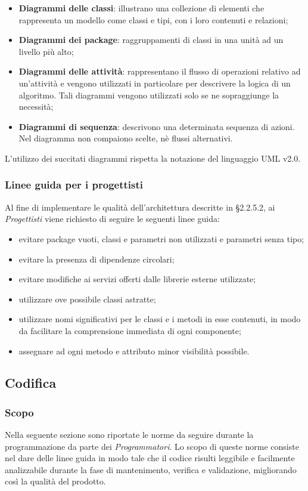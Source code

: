 \documentclass[../NomeDocumento.tex]{subfiles}
\begin{document}
	\begin{itemize}
		\item \textbf{Diagrammi delle classi}: illustrano una collezione di elementi che rappresenta un modello come classi e tipi, con i loro contenuti e relazioni;
		\item \textbf{Diagrammi dei package}: raggruppamenti di classi in una unità ad un livello più alto;
		\item \textbf{Diagrammi delle attività}: rappresentano il flusso di operazioni relativo ad
		un’attività e vengono utilizzati in particolare per descrivere la logica di un algoritmo. Tali diagrammi vengono utilizzati solo se ne sopraggiunge la necessità;
		\item \textbf{Diagrammi di sequenza}: descrivono una determinata sequenza di azioni. Nel diagramma non compaiono scelte, nè flussi
		alternativi.
	\end{itemize}

	\noindent L’utilizzo dei succitati diagrammi rispetta la notazione del linguaggio UML v2.0.
	
	\subsubsection{Linee guida per i progettisti}
	Al fine di implementare le qualità dell’architettura descritte in §2.2.5.2, ai \textit{Progettisti} viene
	richiesto di seguire le seguenti linee guida:
	\begin{itemize}
		\item evitare package vuoti, classi e parametri non utilizzati e parametri senza tipo;
		\item evitare la presenza di dipendenze circolari;
		\item evitare modifiche ai servizi offerti dalle librerie esterne utilizzate;
		\item utilizzare ove possibile classi astratte;
		\item utilizzare nomi significativi per le classi e i metodi in esse contenuti, in modo da
		facilitare la comprensione immediata di ogni componente;
		\item assegnare ad ogni metodo e attributo minor visibilità possibile.
	\end{itemize}
	
	\subsection{Codifica}
	
	\subsubsection{Scopo}
	Nella seguente sezione sono riportate le norme da seguire durante la programmazione da parte dei \textit{Programmatori}. Lo scopo di queste norme consiste nel dare delle linee guida in modo tale che il codice risulti leggibile e facilmente analizzabile durante la fase di mantenimento, verifica e validazione, migliorando così la qualità del prodotto.
\end{document}
